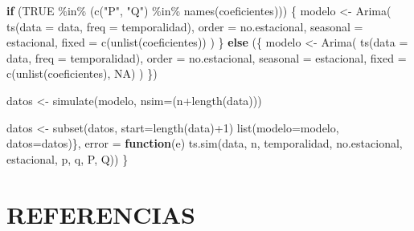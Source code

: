 \documentclass[
]{article}
\newenvironment{Shaded}{\begin{snugshade}}{\end{snugshade}}
\newcommand{\AttributeTok}[1]{\textcolor[rgb]{0.77,0.63,0.00}{#1}}
\newcommand{\ConstantTok}[1]{\textcolor[rgb]{0.00,0.00,0.00}{#1}}
\newcommand{\ControlFlowTok}[1]{\textcolor[rgb]{0.13,0.29,0.53}{\textbf{#1}}}
\newcommand{\DecValTok}[1]{\textcolor[rgb]{0.00,0.00,0.81}{#1}}
\newcommand{\FunctionTok}[1]{\textcolor[rgb]{0.00,0.00,0.00}{#1}}
\newcommand{\NormalTok}[1]{#1}
\newcommand{\OtherTok}[1]{\textcolor[rgb]{0.56,0.35,0.01}{#1}}
\newcommand{\SpecialCharTok}[1]{\textcolor[rgb]{0.00,0.00,0.00}{#1}}
\newcommand{\StringTok}[1]{\textcolor[rgb]{0.31,0.60,0.02}{#1}}
\begin{document}
\begin{Shaded}
\begin{Highlighting}[]
        \ControlFlowTok{if}\NormalTok{ (}\ConstantTok{TRUE} \SpecialCharTok{\%in\%}\NormalTok{ (}\FunctionTok{c}\NormalTok{(}\StringTok{"P"}\NormalTok{, }\StringTok{"Q"}\NormalTok{) }\SpecialCharTok{\%in\%} \FunctionTok{names}\NormalTok{(coeficientes))) \{}
\NormalTok{            modelo }\OtherTok{\textless{}{-}} \FunctionTok{Arima}\NormalTok{(}
                \FunctionTok{ts}\NormalTok{(}\AttributeTok{data =}\NormalTok{ data, }\AttributeTok{freq =}\NormalTok{ temporalidad),}
                \AttributeTok{order =}\NormalTok{ no.estacional,}
                \AttributeTok{seasonal =}\NormalTok{ estacional,}
                \AttributeTok{fixed =} \FunctionTok{c}\NormalTok{(}\FunctionTok{unlist}\NormalTok{(coeficientes))}
\NormalTok{            )}
\NormalTok{        \} }\ControlFlowTok{else}
\NormalTok{            (\{}
\NormalTok{                modelo }\OtherTok{\textless{}{-}} \FunctionTok{Arima}\NormalTok{(}
                    \FunctionTok{ts}\NormalTok{(}\AttributeTok{data =}\NormalTok{ data, }\AttributeTok{freq =}\NormalTok{ temporalidad),}
                    \AttributeTok{order =}\NormalTok{ no.estacional,}
                    \AttributeTok{seasonal =}\NormalTok{ estacional,}
                    \AttributeTok{fixed =} \FunctionTok{c}\NormalTok{(}\FunctionTok{unlist}\NormalTok{(coeficientes), }\ConstantTok{NA}\NormalTok{)}
\NormalTok{                )}
\NormalTok{            \})}
        
\NormalTok{        datos }\OtherTok{\textless{}{-}} \FunctionTok{simulate}\NormalTok{(modelo, }\AttributeTok{nsim=}\NormalTok{(n}\SpecialCharTok{+}\FunctionTok{length}\NormalTok{(data)))}
        
\NormalTok{        datos }\OtherTok{\textless{}{-}} \FunctionTok{subset}\NormalTok{(datos, }\AttributeTok{start=}\FunctionTok{length}\NormalTok{(data)}\SpecialCharTok{+}\DecValTok{1}\NormalTok{)}
        \FunctionTok{list}\NormalTok{(}\AttributeTok{modelo=}\NormalTok{modelo, }\AttributeTok{datos=}\NormalTok{datos)\},}
        \AttributeTok{error =} \ControlFlowTok{function}\NormalTok{(e)}
            \FunctionTok{ts.sim}\NormalTok{(data, n, temporalidad,}
\NormalTok{                   no.estacional, estacional,}
\NormalTok{                   p, q, P, Q))}
\NormalTok{\}}
\end{Highlighting}
\end{Shaded}

\newpage

\section{REFERENCIAS}
\end{document}
